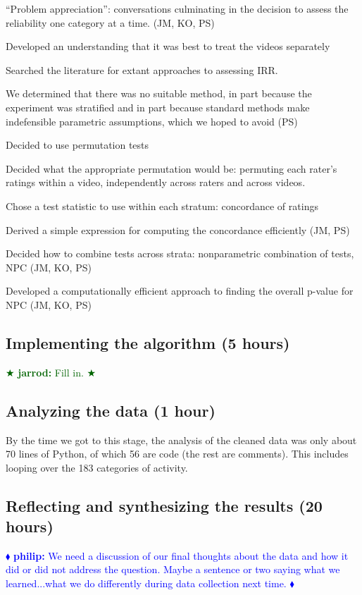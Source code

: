 \documentclass[]{article}
\newcommand{\philip}[1] { \textcolor{blue} {
\ensuremath{\blacklozenge} {\bf philip:}  {#1}
\ensuremath{\blacklozenge} } }
\newcommand{\jarrod}[1] { \textcolor{darkgreen} {
\ensuremath{\bigstar} {\bf jarrod:}  {#1}
\ensuremath{\bigstar} } }
\begin{document}
``Problem appreciation'': conversations culminating in the decision to assess
the reliability one category at a time. (JM, KO, PS)

Developed an understanding that it was best to treat the videos separately

Searched the literature for extant approaches to assessing IRR.

We determined that there was no suitable method, in part because the experiment
was stratified and in part because standard methods make indefensible
parametric assumptions, which we hoped to avoid (PS)

Decided to use permutation tests

Decided what the appropriate permutation would be: permuting each rater's
ratings within a video, independently across raters and across videos.

Chose a test statistic to use within each stratum: concordance of ratings

Derived a simple expression for computing the concordance efficiently (JM, PS)

Decided how to combine tests across strata: nonparametric combination of tests,
NPC (JM, KO, PS)

Developed a computationally efficient approach to finding the overall p-value
for NPC (JM, KO, PS)

\subsection{Implementing the algorithm (5 hours)}

\jarrod{Fill in.}
  
\subsection{Analyzing the data (1 hour)}

By the time we got to this stage, the analysis of the cleaned data was only
about 70 lines of Python, of which 56 are code (the rest are comments).
This includes looping over the 183 categories of activity.

\subsection{Reflecting and synthesizing the results (20 hours)}

\philip{We need a discussion of our final thoughts about the data
and how it did or did not address the question.  Maybe a sentence
or two saying what we learned...what we do differently during
data collection next time.}
\end{document}
